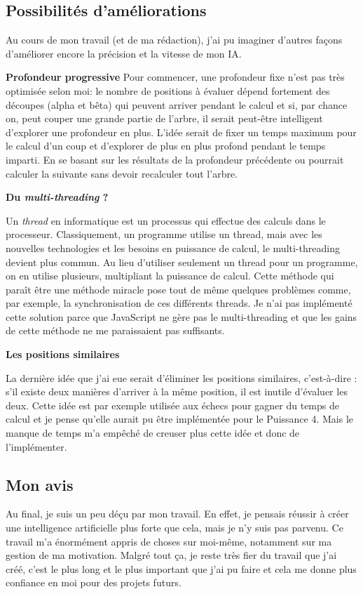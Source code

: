 \documentclass[a4paper]{article}
\newcommand{\ptitle}[1]{\vspace{10pt}
{\large \noindent \textbf{#1}}}
\begin{document}
\subsection{Possibilités d'améliorations}
    Au cours de mon travail (et de ma rédaction), j'ai pu imaginer d'autres façons d'améliorer encore la précision et la vitesse de mon IA.

    \ptitle{Profondeur progressive}
        Pour commencer, une profondeur fixe n'est pas très optimisée selon moi: le nombre de positions à évaluer dépend fortement des découpes (alpha et bêta) qui peuvent arriver pendant le calcul et si, par chance on, peut couper une grande partie de l'arbre, il serait peut-être intelligent d'explorer une profondeur en plus. L'idée serait de fixer un temps maximum pour le calcul d'un coup et d'explorer de plus en plus profond pendant le temps imparti. En se basant sur les résultats de la profondeur précédente ou pourrait calculer la suivante sans devoir recalculer tout l'arbre.

    \ptitle{Du \textit{multi-threading} ?}

        Un \textit{thread} en informatique est un processus qui effectue des calculs dans le processeur. Classiquement, un programme utilise un thread, mais avec les nouvelles technologies et les besoins en puissance de calcul, le multi-threading devient plus commun. Au lieu d'utiliser seulement un thread pour un programme, on en utilise plusieurs, multipliant la puissance de calcul. Cette méthode qui paraît être une méthode miracle pose tout de même quelques problèmes comme, par exemple, la synchronisation de ces différents threads. Je n'ai pas implémenté cette solution parce que JavaScript ne gère pas le multi-threading et que les gains de cette méthode ne me paraissaient pas suffisants.

    \ptitle{Les positions similaires}

        La dernière idée que j'ai eue serait d'éliminer les positions similaires, c'est-à-dire : s'il existe deux manières d'arriver à la même position, il est inutile d'évaluer les deux. Cette idée est par exemple utilisée aux échecs pour gagner du temps de calcul et je pense qu'elle aurait pu être implémentée pour le Puissance 4. Mais le manque de temps m'a empêché de creuser plus cette idée et donc de l'implémenter.

\subsection{Mon avis}
    Au final, je suis un peu déçu par mon travail. En effet, je pensais réussir à créer une intelligence artificielle plus forte que cela, mais je n'y suis pas parvenu. Ce travail m'a énormément appris de choses sur moi-même, notamment sur ma gestion de ma motivation. Malgré tout ça, je reste très fier du travail que j'ai créé, c'est le plus long et le plus important que j'ai pu faire et cela me donne plus confiance en moi pour des projets futurs.
\end{document}
